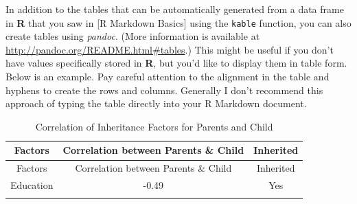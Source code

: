 \documentclass[ms]{uncgdissertationexp}
\theoremstyle{plain}
\theoremstyle{definition}
\theoremstyle{remark}
\begin{document}
  In addition to the tables that can be automatically generated from a
  data frame in \textbf{R} that you saw in {[}R Markdown Basics{]} using
  the \texttt{kable} function, you can also create tables using
  \emph{pandoc}. (More information is available at
  \url{http://pandoc.org/README.html\#tables}.) This might be useful if
  you don't have values specifically stored in \textbf{R}, but you'd like
  to display them in table form. Below is an example. Pay careful
  attention to the alignment in the table and hyphens to create the rows
  and columns. Generally I don't recommend this approach of typing the
  table directly into your R Markdown document.
  \begin{longtable}[]{@{}ccc@{}}
  \caption{\label{tab:inher} Correlation of Inheritance Factors for Parents
  and Child}\tabularnewline
  \toprule
  \begin{minipage}[b]{0.29\columnwidth}\centering\strut
  Factors\strut
  \end{minipage} & \begin{minipage}[b]{0.47\columnwidth}\centering\strut
  Correlation between Parents \& Child\strut
  \end{minipage} & \begin{minipage}[b]{0.16\columnwidth}\centering\strut
  Inherited\strut
  \end{minipage}\tabularnewline
  \midrule
  \endfirsthead
  \toprule
  \begin{minipage}[b]{0.29\columnwidth}\centering\strut
  Factors\strut
  \end{minipage} & \begin{minipage}[b]{0.47\columnwidth}\centering\strut
  Correlation between Parents \& Child\strut
  \end{minipage} & \begin{minipage}[b]{0.16\columnwidth}\centering\strut
  Inherited\strut
  \end{minipage}\tabularnewline
  \midrule
  \endhead
  \begin{minipage}[t]{0.29\columnwidth}\centering\strut
  Education\strut
  \end{minipage} & \begin{minipage}[t]{0.47\columnwidth}\centering\strut
  -0.49\strut
  \end{minipage} & \begin{minipage}[t]{0.16\columnwidth}\centering\strut
  Yes\strut
  \end{minipage}\tabularnewline
  \begin{minipage}[t]{0.29\columnwidth}\centering\strut

\end{minipage}
\end{longtable}
\end{document}
